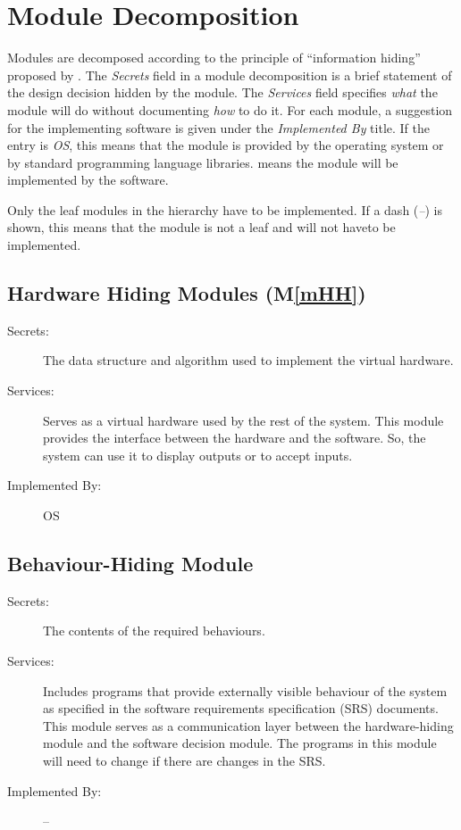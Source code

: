\documentclass[12pt, titlepage]{article}
\newcommand{\mref}[1]{M\ref{#1}}
\begin{document}
\section{Module Decomposition} \label{SecMD}

Modules are decomposed according to the principle of ``information hiding''
proposed by \citet{ParnasEtAl1984}. The \emph{Secrets} field in a module
decomposition is a brief statement of the design decision hidden by the
module. The \emph{Services} field specifies \emph{what} the module will do
without documenting \emph{how} to do it. For each module, a suggestion for the
implementing software is given under the \emph{Implemented By} title. If the
entry is \emph{OS}, this means that the module is provided by the operating
system or by standard programming language libraries. \emph{\progname{}} means
the
module will be implemented by the \progname{} software.

Only the leaf modules in the hierarchy have to be implemented. If a dash
(\emph{--}) is shown, this means that the module is not a leaf and will not
haveto be implemented.

\subsection{Hardware Hiding Modules (\mref{mHH})}

\begin{description}
\item[Secrets:]The data structure and algorithm used to implement the virtual
  hardware.
\item[Services:]Serves as a virtual hardware used by the rest of the
  system. This module provides the interface between the hardware and the
  software. So, the system can use it to display outputs or to accept inputs.
\item[Implemented By:] OS
\end{description}

\subsection{Behaviour-Hiding Module}

\begin{description}
\item[Secrets:]The contents of the required behaviours.
\item[Services:]Includes programs that provide externally visible behaviour of
  the system as specified in the software requirements specification (SRS)
  documents. This module serves as a communication layer between the
  hardware-hiding module and the software decision module. The programs in this
  module will need to change if there are changes in the SRS.
\item[Implemented By:] --
\end{description}
\end{document}

